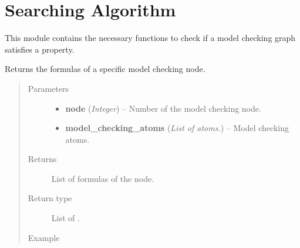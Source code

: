 \documentclass[letterpaper,10pt,english]{sphinxmanual}
\begin{document}
\chapter{Searching Algorithm}
\label{searchingAlgorithm:searching-algorithm}\label{searchingAlgorithm:module-searchingAlgorithm}\label{searchingAlgorithm::doc}
This module contains the necessary functions to check if a model checking graph satisfies a property.

\begin{fulllineitems}
\label{searchingAlgorithm:searchingAlgorithm.getFormulas}
Returns the formulas of a specific model checking node.
\begin{quote}\begin{description}
\item[{Parameters}] \leavevmode\begin{itemize}
\item {} 
\textbf{node} (\emph{Integer}) -- Number of the model checking node.

\item {} 
\textbf{model\_checking\_atoms} (\emph{List of atoms.}) -- Model checking atoms.

\end{itemize}

\item[{Returns}] \leavevmode
List of formulas of the node.

\item[{Return type}] \leavevmode
List of {\hyperref[formula:formula.Formula]{}}.

\item[{Example }] \leavevmode
\end{description}\end{quote}


\end{fulllineitems}
\end{document}
